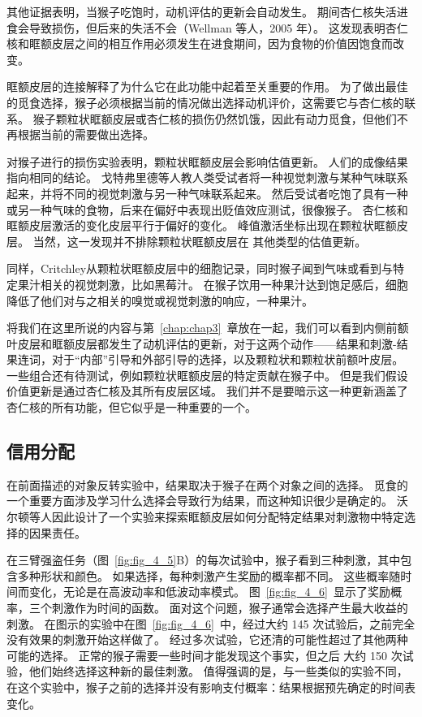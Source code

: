 其他证据表明，当猴子吃饱时，动机评估的更新会自动发生。
期间杏仁核失活进食会导致损伤，但后来的失活不会（Wellman 等人，2005 年）。
这发现表明杏仁核和眶额皮层之间的相互作用必须发生在进食期间，因为食物的价值因饱食而改变。\par


眶额皮层的连接解释了为什么它在此功能中起着至关重要的作用。
为了做出最佳的觅食选择，猴子必须根据当前的情况做出选择动机评价，这需要它与杏仁核的联系。
猴子颗粒状眶额皮层或杏仁核的损伤仍然饥饿，因此有动力觅食，但他们不再根据当前的需要做出选择。\par


对猴子进行的损伤实验表明，颗粒状眶额皮层会影响估值更新。
人们的成像结果指向相同的结论。
戈特弗里德等人\cite{gottfried2003encoding}教人类受试者将一种视觉刺激与某种气味联系起来，并将不同的视觉刺激与另一种气味联系起来。
然后受试者吃饱了具有一种或另一种气味的食物，后来在偏好中表现出贬值效应测试，很像猴子。
杏仁核和眶额皮层激活的变化皮层平行于偏好的变化。
峰值激活坐标出现在颗粒状眶额皮层。
当然，这一发现并不排除颗粒状眶额皮层在
其他类型的估值更新。\par


同样，Critchley\cite{critchley1996hunger}从颗粒状眶额皮层中的细胞记录，同时猴子闻到气味或看到与特定果汁相关的视觉刺激，比如黑莓汁。
在猴子饮用一种果汁达到饱足感后，细胞降低了他们对与之相关的嗅觉或视觉刺激的响应，一种果汁。\par


将我们在这里所说的内容与第~\ref{chap:chap3}~章放在一起，我们可以看到内侧前额叶皮层和眶额皮层都发生了动机评估的更新，对于这两个动作——结果和刺激-结果连词，对于“内部”引导和外部引导的选择，以及颗粒状和颗粒状前额叶皮层。
一些组合还有待测试，例如颗粒状眶额皮层的特定贡献在猴子中。
但是我们假设价值更新是通过杏仁核及其所有皮层区域。
我们并不是要暗示这一种更新涵盖了杏仁核的所有功能，但它似乎是一种重要的一个。\par



\subsection{信用分配}

在前面描述的对象反转实验中，结果取决于猴子在两个对象之间的选择。
觅食的一个重要方面涉及学习什么选择会导致行为结果，而这种知识很少是确定的。
沃尔顿等人\cite{walton2010separable}因此设计了一个实验来探索眶额皮层如何分配特定结果对刺激物中特定选择的因果责任。\par


在三臂强盗任务（图~\ref{fig:fig_4_5}B）的每次试验中，猴子看到三种刺激，其中包含多种形状和颜色。
如果选择，每种刺激产生奖励的概率都不同。
这些概率随时间而变化，无论是在高波动率和低波动率模式。
图~\ref{fig:fig_4_6}~显示了奖励概率，三个刺激作为时间的函数。
面对这个问题，猴子通常会选择产生最大收益的刺激。
在图示的实验中在图~\ref{fig:fig_4_6}~中，经过大约 145 次试验后，之前完全没有效果的刺激开始这样做了。
经过多次试验，它还清的可能性超过了其他两种可能的选择。
正常的猴子需要一些时间才能发现这个事实，但之后
大约 150 次试验，他们始终选择这种新的最佳刺激。
值得强调的是，与一些类似的实验不同，在这个实验中，猴子之前的选择并没有影响支付概率：结果根据预先确定的时间表变化。\par


